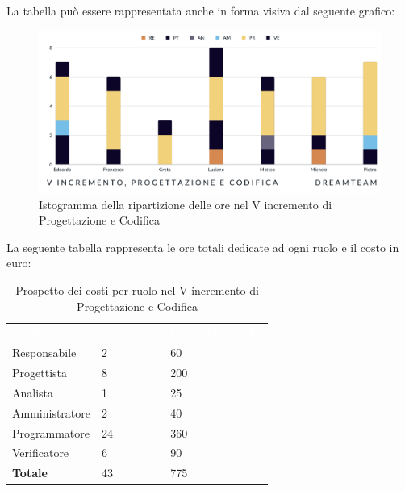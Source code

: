 La tabella può essere rappresentata anche in forma visiva dal seguente grafico:
\begin{figure}[H]
\centering
\includegraphics[scale=0.50]{Sezioni/SezioniPreventivo/grafici/progettazione/Progettazione_V_incremento.png}
\caption{Istogramma della ripartizione delle ore nel V incremento di Progettazione e Codifica}
\end{figure}

La seguente tabella rappresenta le ore totali dedicate ad ogni ruolo e il costo in euro:

\begin{table}[H]
\begin{center}
\renewcommand{\arraystretch}{1.5}
\begin{tabular}{ m{}<{\centering}  m{}<{\centering} m{}<{\centering}}
	\rowcolor{darkblue}
	\textcolor{white}{\textbf{Ruolo}}&\textcolor{white}{\textbf{Totale ore}}&\textcolor{white}{\textbf{Costo totale (\euro)}}\\ 

	Responsabile & 2 & 60 \\	
	
	Progettista & 8 & 200 \\
	
	Analista & 1 & 25 \\

	Amministratore & 2 & 40 \\
	
	Programmatore & 24 & 360 \\
	
	Verificatore & 6 & 90 \\
	
	\textbf{Totale} & 43 & 775 \\
	
\end{tabular}
\caption{Prospetto dei costi per ruolo nel V incremento di Progettazione e Codifica}
\end{center}
\end{table}

